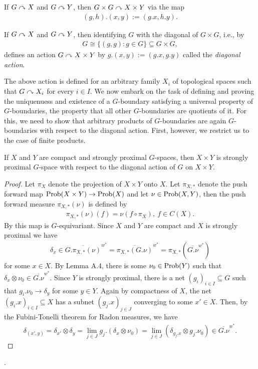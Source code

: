 If $G \curvearrowright X$ and $G \curvearrowright Y$, then $G \times G \curvearrowright X \times Y$ via the map 
\begin{align*}
(g,h).(x,y):= (g.x,h.y).
\end{align*}
\begin{definition}
If $G \curvearrowright X$ and $G \curvearrowright Y$, then identifying $G$ with the diagonal of $G \times G$, i.e., by
\begin{align*}
G \cong \{ (g,g) \colon g \in G \} \subseteq G \times G,
\end{align*}
defines an action $G \curvearrowright X \times Y$ by $g.(x,y):= (g.x,g.y)$ called the \emph{diagonal action}.
\end{definition}
The above action is defined for an arbitrary family $X_{i}$ of topological spaces such that $G \curvearrowright X_{i}$ for every $i \in I$.
%
%
We now embark on the task of defining and proving the uniquenuess and existence of a $G$-boundary satisfying a universal property of $G$-boundaries, the property that all other $G$-boundaries are quotients of it. For this, we need to show that arbitrary products of $G$-boundaries are again $G$-boundaries with respect to the diagonal action. First, however, we restrict us to the case of finite products.
\begin{lemma}\label{product finite strongly proximal}
If $X$ and $Y$ are compact and strongly proximal $G$-spaces, then $X \times Y$ is strongly proximal $G$-space with respect to the diagonal action of $G$ on $X \times Y$.
\begin{proof}
Let $\pi_{X}$ denote the projection of $X \times Y$ onto $X$. Let $\pi_{X,*}$ denote the push forward map $\operatorname{Prob}(X \times Y) \to \operatorname{Prob}(X)$ and let $\nu \in \operatorname{Prob}(X,Y)$, then the push forward measure $\pi_{X,*}(\nu)$ is defined by 
\begin{align*}
\pi_{X,*}(\nu)(f)=\nu(f \circ \pi_X),\ f \in C(X).
\end{align*} 
By  this map is $G$-equivariant. Since $X$ and $Y$ are compact and $X$ is strongly proximal we have
\begin{align*}
\delta_{x} \in \overline{G.\pi_{X,*}(\nu)}^{w^*}=\overline{\pi_{X,*}(G.\nu)}^{w^*}=\pi_{X,*}\left(\overline{G.\nu}^{w^*}\right)
\end{align*}
for some $x \in X$. By Lemma A.4, there is some $\nu_0 \in \operatorname{Prob}(Y)$ such that $\delta_{x} \otimes \nu_0 \in \overline{G.\nu}^{w^*}$. Since $Y$ is strongly proximal, there is a net $(g_{i})_{i \in I} \subseteq G$ such that $g_{i}.\nu_0 \to \delta_{y}$ for some $y \in Y$. Again by compactness of $X$, the net $(g_{i}.x)_{i \in I} \subseteq X$ has a subnet $(g_j.x)_{j \in J}$ converging to some $x' \in X$. Then, by the Fubini-Tonelli theorem for Radon measures, we have
\begin{align*}
\delta_{(x',y)}=\delta_{x'} \otimes \delta_{y}= \lim_{j \in J} g_j.(\delta_x \otimes \nu_0)=\lim_{j \in J} (\delta_{g_{j}.x} \otimes g_{j} .\nu_0)\in \overline{G.\nu}^{w^*}.
\end{align*}
\end{proof}
\end{lemma}. 
